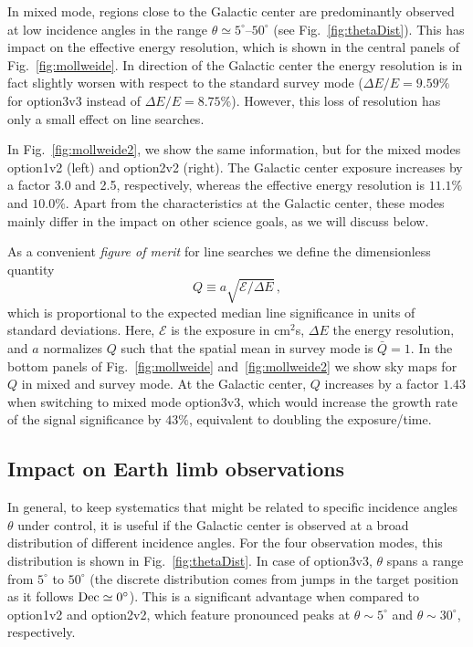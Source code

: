 \documentclass[aps,prd,superscriptaddress,nofootinbib,fixlfloat, 12pt]{revtex4-1}
\begin{document}
In mixed mode, regions close to the Galactic center are predominantly observed
at low incidence angles in the range $\theta\simeq5^\circ$--$50^\circ$ (see
Fig.~\ref{fig:thetaDist}). This has impact on the effective energy resolution,
which is shown in the central panels of Fig.~\ref{fig:mollweide}. In direction
of the Galactic center the energy resolution is in fact slightly worsen with respect to the
standard survey mode ($\Delta E/E=9.59\%$ for option3v3 instead of $\Delta E/E=8.75\%$).
However, this loss of resolution has only a small effect on line searches.

In Fig.~\ref{fig:mollweide2}, we show the same information, but for the mixed
modes option1v2 (left) and option2v2 (right). The Galactic center exposure increases by a
factor 3.0 and 2.5, respectively, whereas the effective energy resolution is
$11.1\%$ and $10.0\%$. Apart from the characteristics at the Galactic center, these modes
mainly differ in the impact on other science goals, as we will discuss below.
\medskip

As a convenient \emph{figure of merit} for line searches we define the
dimensionless quantity $$Q\equiv a\sqrt{\mathcal{E}/\Delta E}\,,$$ which is
proportional to the expected median line significance in units of standard
deviations.  Here, $\mathcal{E}$ is the exposure in cm$^2$s, $\Delta E$ the
energy resolution, and $a$
normalizes $Q$ such that the spatial mean in survey mode is $\bar Q=1$. In the
bottom panels of Fig.~\ref{fig:mollweide} and~\ref{fig:mollweide2} we show sky maps for $Q$ in mixed and
survey mode.  At the Galactic center, $Q$ increases by a factor $1.43$ when
switching to mixed mode option3v3, which would increase the growth rate of
the signal significance by $43\%$, equivalent to doubling the exposure/time. 

\subsection{Impact on Earth limb observations}
In general, to keep systematics that might be related to specific incidence
angles $\theta$ under control, it is useful if the Galactic center is observed
at a broad distribution of different incidence angles. For the four
observation modes, this distribution is shown in
Fig.~\ref{fig:thetaDist}. In case of option3v3, $\theta$ spans a range from
$5^\circ$ to $50^\circ$ (the discrete distribution comes from jumps in the
target position as it follows $\rm Dec\simeq0^\circ$). This is a significant
advantage
when compared to option1v2 and option2v2, which feature pronounced peaks at
$\theta\sim5^\circ$ and $\theta\sim30^\circ$, respectively.
\end{document}
